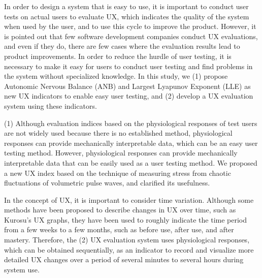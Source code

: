 \begin{eabstract}

In order to design a system that is easy to use, it is important to conduct user tests on actual users to evaluate UX, which indicates the quality of the system when used by the user, and to use this cycle to improve the product. However, it is pointed out that few software development companies conduct UX evaluations, and even if they do, there are few cases where the evaluation results lead to product improvements. In order to reduce the hurdle of user testing, it is necessary to make it easy for users to conduct user testing and find problems in the system without specialized knowledge. In this study, we (1) propose Autonomic Nervous Balance (ANB) and Largest Lyapunov Exponent (LLE) as new UX indicators to enable easy user testing, and (2) develop a UX evaluation system using these indicators.

(1) Although evaluation indices based on the physiological responses of test users are not widely used because there is no established method, physiological responses can provide mechanically interpretable data, which can be an easy user testing method. However, physiological responses can provide mechanically interpretable data that can be easily used as a user testing method. We proposed a new UX index based on the technique of measuring stress from chaotic fluctuations of volumetric pulse waves, and clarified its usefulness.

In the concept of UX, it is important to consider time variation. Although some methods have been proposed to describe changes in UX over time, such as Kurosu's UX graphs, they have been used to roughly indicate the time period from a few weeks to a few months, such as before use, after use, and after mastery. Therefore, the (2) UX evaluation system uses physiological responses, which can be obtained sequentially, as an indicator to record and visualize more detailed UX changes over a period of several minutes to several hours during system use.

\end{eabstract}
